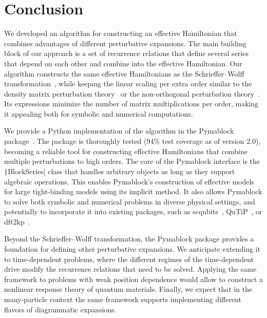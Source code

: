 \section{Conclusion}

We developed an algorithm for constructing an effective Hamiltonian that combines advantages of different perturbative expansions.
The main building block of our approach is a set of recurrence relations that define several series that depend on each other and combine into the effective Hamiltonian.
Our algorithm constructs the same effective Hamiltonians as the Schrieffer--Wolff transformation~\cite{Schrieffer_1966}, while keeping the linear scaling per extra order similar to the density matrix perturbation theory~\cite{McWeeny_1962, Truflandier_2020} or the non-orthogonal perturbation theory~\cite{Bloch_1958}.
Its expressions minimize the number of matrix multiplications per order, making it appealing both for symbolic and numerical computations.

We provide a Python implementation of the algorithm in the Pymablock package~\cite{Araya_2024}.
The package is thoroughly tested (94\% test coverage as of version 2.0), becoming a reliable tool for constructing effective Hamiltonians that combine multiple perturbations to high orders.
The core of the Pymablock interface is the \texttt|BlockSeries| class that handles arbitrary objects as long as they support algebraic operations.
This enables Pymablock's construction of effective models for large tight-binding models using its implicit method.
It also allows Pymablock to solve both symbolic and numerical problems in diverse physical settings, and potentially to incorporate it into existing packages, such as scqubits~\cite{Groszkowski_2021}, QuTiP~\cite{Johansson_2012,Johansson_2013}, or dft2kp~\cite{Cassiano_2024}.

Beyond the Schrieffer--Wolff transformation, the Pymablock package provides a foundation for defining other perturbative expansions.
We anticipate extending it to time-dependent problems, where the different regimes of the time-dependent drive modify the recurrence relations that need to be solved.
Applying the same framework to problems with weak position dependence would allow to construct a nonlinear response theory of quantum materials.
Finally, we expect that in the many-particle context the same framework supports implementing different flavors of diagrammatic expansions.
